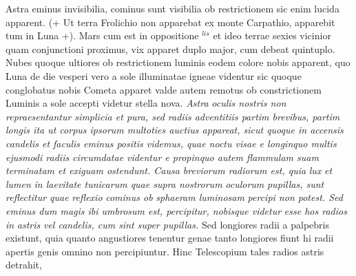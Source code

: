 \pstart 
[98 r\textsuperscript{o}]  Astra eminus invisibilia, cominus sunt visibilia ob restrictionem  sic enim lucida apparent. (+ Ut terra\protect{} Frolichio\protect{} non apparebat ex monte Carpathio\protect{}, apparebit tum in Luna\protect{} +). Mars\protect{} cum  est in oppositione \astrosun $^{lis}$ et ideo terrae\protect{} sexies vicinior quam conjunctioni proximus, vix apparet duplo major, cum debeat quintuplo. Nubes  quoque ultiores ob restrictionem luminis\protect{} eodem colore\protect{}\protect{} nobis apparent, quo Luna\protect{} de die  vesperi vero a sole\protect{} illuminatae igneae  videntur sic quoque  conglobatus  nobis Cometa\protect{} apparet valde autem  remotus ob constrictionem Luminis\protect{} a sole\protect{}  accepti videtur stella nova\protect{}. \textit{Astra}\protect{}\textit{  oculis nostris non repraesentantur simplicia  et pura, sed radiis adventitiis partim brevibus,  partim longis ita ut corpus ipsorum multoties  auctius appareat, sicut quoque in accensis candelis  et faculis eminus positis videmus, quae noctu visae  e longinquo multis ejusmodi radiis circumdatae videntur e propinquo autem flammulam suam terminatam et exiguam ostendunt.  Causa breviorum radiorum est, quia }\textit{lux}\protect{}\textit{ et }\textit{lumen}\protect{}\textit{  in laevitate tunicarum quae supra nostrorum }\textit{oculorum}\protect{}\textit{ }\textit{pupillas}\protect{}\textit{, sunt reflectitur quae }\textit{reflexio}\protect{}\textit{ cominus ob }\textit{sphaeram luminosam}\protect{}\textit{ percipi non potest. Sed eminus dum magis ibi umbrosum est, percipitur, nobisque videtur}\textit{ esse hos radios in }\textit{astris}\protect{}\textit{ vel  candelis, cum sint super pupillas}\protect{}\textit{.} Sed longiores radii a palpebris existunt, quia  quanto angustiores tenentur genae tanto  longiores fiunt hi radii apertis genis omnino  non percipiuntur. Hinc Telescopium\protect{} tales radios  astris detrahit, 